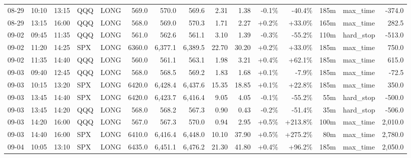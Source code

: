 \documentclass[11pt,a4paper,twoside]{article}
\begin{document}
\begin{landscape}
\begin{center}
\begin{longtable}{>{\color{txtmain}}l l l l l r r r r r r r r >{\color{txtmain}}l r}
08-29 & 10:10 & 13:15 & QQQ & LONG & 569.0 & 570.0 & 569.6 & 2.31 & 1.38 & \textcolor{lossred}{-0.1\%} & \textcolor{lossred}{-40.4\%} & 185m & max\_time & \textcolor{lossred}{-374.0} \\
08-29 & 13:15 & 16:00 & QQQ & LONG & 568.0 & 569.0 & 570.3 & 1.71 & 2.27 & \textcolor{wingreen}{+0.2\%} & \textcolor{wingreen}{+33.0\%} & 165m & max\_time & \textcolor{wingreen}{282.5} \\
09-02 & 09:45 & 11:35 & QQQ & LONG & 561.0 & 562.6 & 561.1 & 3.10 & 1.39 & \textcolor{lossred}{-0.3\%} & \textcolor{lossred}{-55.2\%} & 110m & hard\_stop & \textcolor{lossred}{-513.0} \\
09-02 & 11:20 & 14:25 & SPX & LONG & 6360.0 & 6,377.1 & 6,389.5 & 22.70 & 30.20 & \textcolor{wingreen}{+0.2\%} & \textcolor{wingreen}{+33.0\%} & 185m & max\_time & \textcolor{wingreen}{750.0} \\
09-02 & 11:35 & 14:40 & QQQ & LONG & 560.0 & 561.1 & 563.1 & 1.98 & 3.21 & \textcolor{wingreen}{+0.4\%} & \textcolor{wingreen}{+62.1\%} & 185m & max\_time & \textcolor{wingreen}{615.0} \\
09-03 & 09:40 & 12:45 & QQQ & LONG & 568.0 & 568.5 & 569.2 & 1.83 & 1.68 & \textcolor{wingreen}{+0.1\%} & \textcolor{lossred}{-7.9\%} & 185m & max\_time & \textcolor{lossred}{-72.5} \\
09-03 & 10:15 & 13:20 & SPX & LONG & 6420.0 & 6,428.4 & 6,437.6 & 15.35 & 18.85 & \textcolor{wingreen}{+0.1\%} & \textcolor{wingreen}{+22.8\%} & 185m & max\_time & \textcolor{wingreen}{350.0} \\
09-03 & 13:45 & 14:40 & SPX & LONG & 6420.0 & 6,423.7 & 6,416.4 & 9.05 & 4.05 & \textcolor{lossred}{-0.1\%} & \textcolor{lossred}{-55.2\%} & 55m & hard\_stop & \textcolor{lossred}{-500.0} \\
09-03 & 13:45 & 14:20 & QQQ & LONG & 568.0 & 568.2 & 567.3 & 0.90 & 0.43 & \textcolor{lossred}{-0.2\%} & \textcolor{lossred}{-51.4\%} & 35m & hard\_stop & \textcolor{lossred}{-506.0} \\
09-03 & 14:20 & 16:00 & QQQ & LONG & 567.0 & 567.3 & 570.0 & 0.94 & 2.95 & \textcolor{wingreen}{+0.5\%} & \textcolor{wingreen}{+213.8\%} & 100m & max\_time & \textcolor{wingreen}{2,010.0} \\
09-03 & 14:40 & 16:00 & SPX & LONG & 6410.0 & 6,416.4 & 6,448.0 & 10.10 & 37.90 & \textcolor{wingreen}{+0.5\%} & \textcolor{wingreen}{+275.2\%} & 80m & max\_time & \textcolor{wingreen}{2,780.0} \\
09-04 & 10:05 & 13:10 & SPX & LONG & 6435.0 & 6,451.1 & 6,476.2 & 21.30 & 41.80 & \textcolor{wingreen}{+0.4\%} & \textcolor{wingreen}{+96.2\%} & 185m & max\_time & \textcolor{wingreen}{2,050.0} \\

\end{longtable}
\end{center}
\end{landscape}
\end{document}
